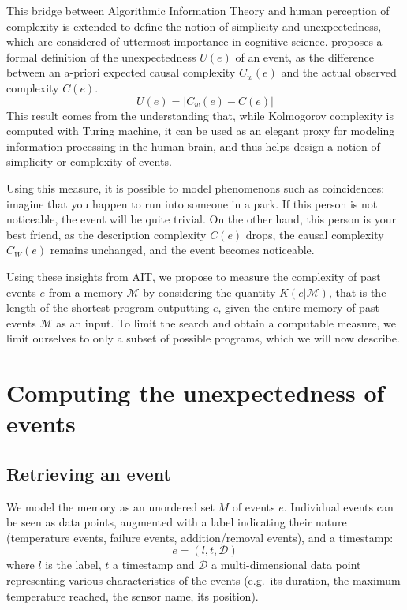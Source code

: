 \documentclass[conference]{IEEEtran}
\begin{document}
This bridge between Algorithmic Information Theory and human perception of
complexity is extended to define the notion of simplicity and unexpectedness,
which are considered of uttermost importance in cognitive science\cite
{chater_simplicity_2003}.
\cite{dessalles2011coincidences} proposes a formal definition of the
 unexpectedness $U(e)$ of an event, as the difference between an a-priori
 expected causal complexity $C_{w}(e)$ and the actual observed complexity $C
 (e)$.
\begin{equation}
  \label{eq:unexpected}
  U(e) = |C_{w}(e) - C(e)|
\end{equation}
This result comes from the understanding that, while Kolmogorov complexity is
computed with Turing machine, it can be used as an elegant proxy for modeling
information processing in the human brain, and thus helps design a notion of
simplicity or complexity of events.

Using this measure, it is possible to model phenomenons such as coincidences:
imagine that you happen to run into someone in a park. If this person is not
noticeable, the event will be quite trivial. On the other hand, this person is
your best friend, as the description complexity $C(e)$ drops, the causal
complexity $C_{W}(e)$ remains unchanged, and the event becomes noticeable.

Using these insights from AIT, we propose to measure the complexity of past
events $e$ from a memory $\mathcal{M}$ by considering the quantity
$K(e|\mathcal{M})$, that is the length of the shortest program outputting $e$,
given the entire memory of past events $\mathcal{M}$ as an input. To limit the
search and obtain a computable measure, we limit ourselves to only a subset of
possible programs, which we will now describe.

\section{Computing the unexpectedness of events}
\label{sec:computing}
\subsection{Retrieving an event}
We model the memory as an unordered set $M$ of events $e$. Individual events can
be seen as data points, augmented with a label indicating their nature
(temperature events, failure events, addition/removal events), and a timestamp:
\begin{equation}
  \label{eq:event}
  e = (l, t,\mathcal{D})
\end{equation}
where $l$ is the label, $t$ a timestamp and $\mathcal{D}$ a multi-dimensional
data point representing various characteristics of the events (e.g.~its duration,
the maximum temperature reached, the sensor name, its position).
\end{document}
